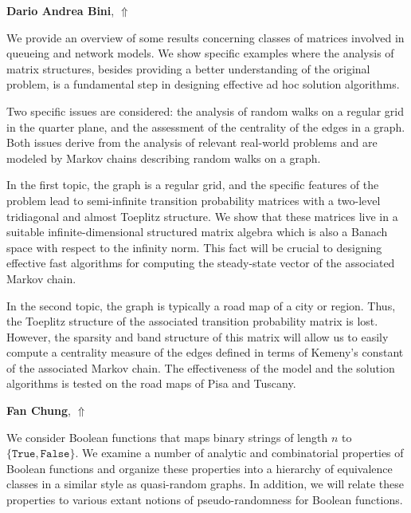 \documentclass[ILAS2025-program.tex]{subfiles}
\begin{document}
\hypertarget{down0005}{}\begin{ilasabstract}
    
\textbf{Dario Andrea Bini},  \hfill \hyperlink{up0005}{$\Uparrow$}
    
    
\mtskip
    We provide an overview of some results concerning classes of matrices involved in queueing and network models. We show specific examples where the analysis of matrix structures, besides providing a better understanding of the original problem, is a fundamental step in designing effective ad hoc solution algorithms.

Two specific issues are considered:  the analysis of random walks on a regular grid in the quarter plane, and the assessment of the centrality of the edges in a graph. Both issues derive from the analysis of relevant real-world problems and are modeled by Markov chains describing random walks on a graph. 

In the first topic, the graph is a regular grid, and the specific features of the problem lead to semi-infinite transition probability matrices with a two-level tridiagonal and almost Toeplitz structure. We show that these matrices live in a suitable infinite-dimensional structured matrix algebra which is also a Banach space with respect to the infinity norm. This fact will be crucial to designing effective fast algorithms for computing the steady-state vector of the associated Markov chain.

In the second topic, the graph is typically a road map of a city or region. Thus, the Toeplitz structure of the associated transition probability matrix is lost. However, the sparsity and band structure of this matrix will allow us to easily compute a centrality measure of the edges defined in terms of Kemeny's constant of the associated Markov chain. The effectiveness of the model and the solution algorithms is tested on the road maps of Pisa and Tuscany.

\end{ilasabstract}
    

\hypertarget{down0006}{}\begin{ilasabstract}
    
\textbf{Fan Chung},  \hfill \hyperlink{up0006}{$\Uparrow$}
    
    
\mtskip
    We consider Boolean functions that maps binary strings of length $n$ to $\{\mathtt{True}, \mathtt{False}\}$.
We examine a number of analytic and combinatorial properties of Boolean functions and organize these properties into a hierarchy of equivalence classes in a similar style as quasi-random graphs.  In addition, we will relate these properties to various extant notions of pseudo-randomness for Boolean functions.
\end{ilasabstract}
    
\end{document}
